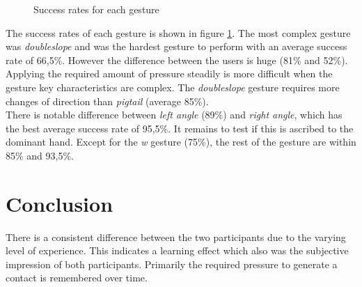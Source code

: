 \begin{center}
\begin{figure}
\caption{Success rates for each gesture}
\label{fig:gestures}
\end{figure}
\end{center}
The success rates of each gesture is shown in figure \ref{fig:gestures}. The most complex gesture was \emph{doubleslope} and was the hardest gesture to perform with an average success rate of 66,5\%. However the difference between the users is huge (81\% and 52\%). Applying the required amount of pressure steadily is more difficult when the gesture key characteristics are complex. The \emph{doubleslope} gesture requires more changes of direction than \emph{pigtail} (average 85\%).
\\
There is notable difference between \emph{left angle} (89\%) and \emph{right angle}, which has the best  average success rate of 95,5\%. It remains to test if this is ascribed to the dominant hand. Except for the \emph{w} gesture (75\%), the rest of the gesture are within 85\% and 93,5\%. 

\section{Conclusion}
There is a consistent difference between the two participants due to the varying level of experience. This indicates a learning effect which also was the subjective impression of both participants. Primarily the required pressure to generate a contact is remembered over time. 